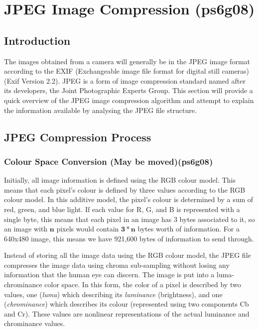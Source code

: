 
\section{JPEG Image Compression (ps6g08)}
\label{jpeg_image_compression}
\subsection{Introduction}
The images obtained from a camera will generally be in the JPEG image format
according to the 
EXIF (Exchangeable image file format for digital still cameras)
 (Exif Version 2.2).\cite{exif_std} 
JPEG is a form of image compression standard named after its developers, 
the Joint Photographic Experts Group. \cite{winzip_jpeg_compression}
This section will provide a quick overview of the JPEG image compression algorithm
and attempt to explain the information available by
analysing the JPEG file structure.

\subsection{JPEG Compression Process}

\subsubsection{Colour Space Conversion (May be moved)(ps6g08)}
\label{sec:colour_space_conversion}
Initially, all image information is defined using the RGB colour model.
This means that each pixel's colour is defined by three values according to the RGB colour model. 
In this additive model, the pixel's colour is determined by a sum of red, green, and blue light. 
If each value for R, G, and B is represented with a single byte, 
this means that each pixel in an image has 3 bytes associated to it, so 
an image with $\mathbf{n}$ pixels would contain $\mathbf{3*n}$ bytes worth of information. 
For a 640x480 image, this means we have 921,600 bytes of information to send through.

Instead of storing all the image data using the RGB colour model, 
the JPEG file compresses the image data using chroma sub-sampling 
without losing any information that the human eye can discern. 
The image is put into  a luma-chrominance color space. In this form, the color of a pixel is described by two values, 
one (\emph{luma}) which describing its \emph{luminance} (brightness), and 
one (\emph{chrominance}) which describes its colour 
(represented using two components Cb and Cr).
These values are nonlinear representations
of the actual luminance and chrominance values.\cite{kerr_chroma_subsampling}

